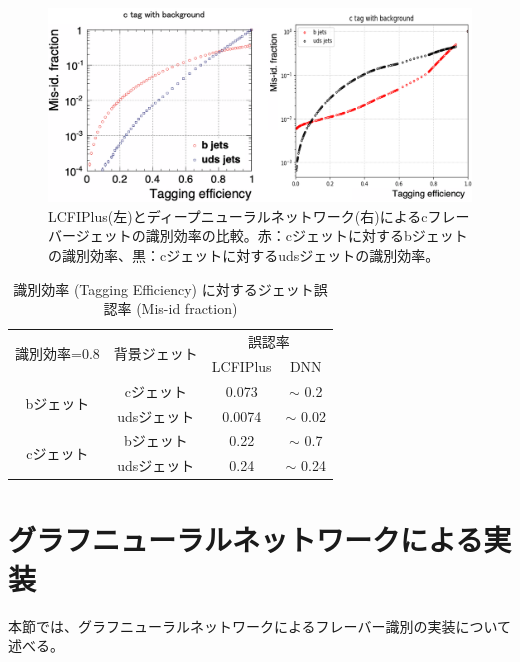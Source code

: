 \begin{figure}[H]
	\begin{center}
 \includegraphics[keepaspectratio, scale=0.3]
 	{Figure/Flavortagging/dnneff_c.png}
 		\caption{LCFIPlus(左)とディープニューラルネットワーク(右)によるcフレーバージェットの識別効率の比較。赤：cジェットに対するbジェットの識別効率、黒：cジェットに対するudsジェットの識別効率。}
 		\label{dnneff_c}
	\end{center}
\end{figure}
\begin{table}[H]
 \centering
  \begin{tabular}{ |c|c|c|c|}
   \toprule
   \multirow{2}{*}{識別効率=0.8} & \multirow{2}{*}{背景ジェット} & \multicolumn{2}{|c|}{誤認率} \\
    & & LCFIPlus & DNN\\ \cline{3-4} 
    \midrule
    \midrule
   \multirow{2}{*}{bジェット} & cジェット & 0.073 & $\sim$ 0.2\\ \cline{2-2} 
   & udsジェット & 0.0074 & $\sim$ 0.02 \\ \cline{1-2} 
   \multirow{2}{*}{cジェット} & bジェット & 0.22 & $\sim$ 0.7\\ \cline{2-2} 
   & udsジェット & 0.24 & $\sim$ 0.24\\
   \bottomrule
  \end{tabular}
  \caption{識別効率 (Tagging Efficiency) に対するジェット誤認率 (Mis-id fraction)}
  \label{dnneff80}
\end{table}

\section{グラフニューラルネットワークによる実装}
本節では、グラフニューラルネットワークによるフレーバー識別の実装について述べる。
